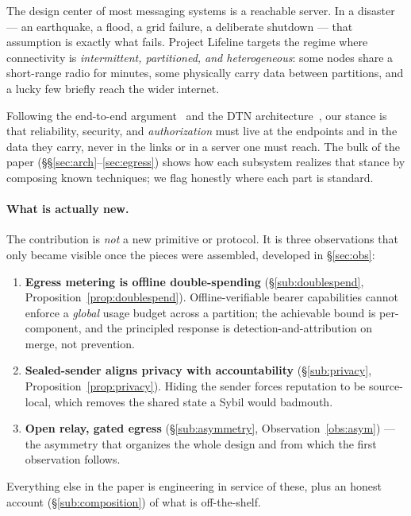 \documentclass[11pt]{article}
\begin{document}
The design center of most messaging systems is a reachable server. In a
disaster --- an earthquake, a flood, a grid failure, a deliberate shutdown ---
that assumption is exactly what fails. Project Lifeline targets the regime where
connectivity is \emph{intermittent, partitioned, and heterogeneous}: some nodes
share a short-range radio for minutes, some physically carry data between
partitions, and a lucky few briefly reach the wider internet.

Following the end-to-end argument~\cite{saltzer1984endtoend} and the DTN
architecture~\cite{rfc4838,rfc5050,rfc9171}, our stance is that reliability,
security, and \emph{authorization} must live at the endpoints and in the data
they carry, never in the links or in a server one must reach. The bulk of the
paper (\S\S\ref{sec:arch}--\ref{sec:egress}) shows how each subsystem realizes
that stance by composing known techniques; we flag honestly where each part is
standard.

\paragraph{What is actually new.} The contribution is \emph{not} a new primitive
or protocol. It is three observations that only became visible once the pieces
were assembled, developed in \S\ref{sec:obs}:
\begin{enumerate}[leftmargin=1.6em,itemsep=1pt]
  \item \textbf{Egress metering is offline double-spending}
  (\S\ref{sub:doublespend}, Proposition~\ref{prop:doublespend}). Offline-verifiable
  bearer capabilities cannot enforce a \emph{global} usage budget across a
  partition; the achievable bound is per-component, and the principled response
  is detection-and-attribution on merge, not prevention.
  \item \textbf{Sealed-sender aligns privacy with accountability}
  (\S\ref{sub:privacy}, Proposition~\ref{prop:privacy}). Hiding the sender forces
  reputation to be source-local, which removes the shared state a Sybil would
  badmouth.
  \item \textbf{Open relay, gated egress} (\S\ref{sub:asymmetry},
  Observation~\ref{obs:asym}) --- the asymmetry that organizes the whole design
  and from which the first observation follows.
\end{enumerate}
Everything else in the paper is engineering in service of these, plus an honest
account (\S\ref{sub:composition}) of what is off-the-shelf.
\end{document}
